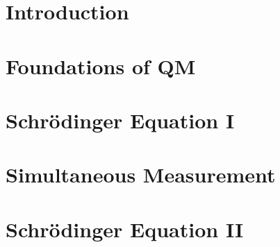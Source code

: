 \documentclass[british,11pt,a4paper]{report}
\begin{document}
\maketitle
\tableofcontents

\chapter{Introduction}

\chapter{Foundations of QM}

\chapter{Schr\"odinger Equation I}
%
\chapter{Simultaneous Measurement}
%
\chapter{Schr\"odinger Equation II}
%
\end{document}

